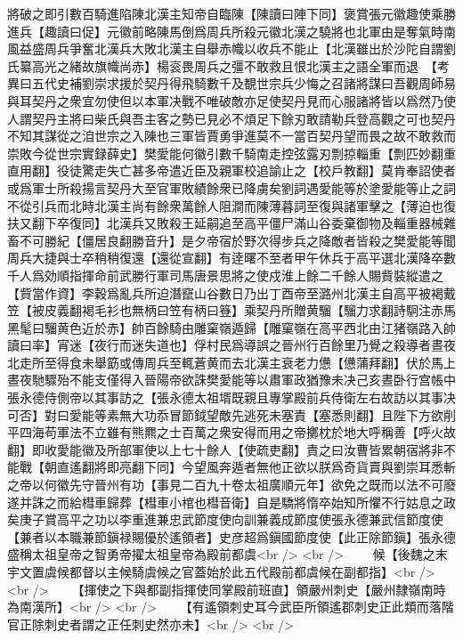 將破之即引數百騎進陷陳北漢主知帝自臨陳【陳讀曰陣下同】褒賞張元徽趣使乘勝進兵【趣讀曰促】元徽前略陳馬倒爲周兵所殺元徽北漢之驍將也北軍由是奪氣時南風益盛周兵爭奮北漢兵大敗北漢主自舉赤幟以收兵不能止【北漢雖出於沙陀自謂劉氏纂高光之緒故旗幟尚赤】楊衮畏周兵之彊不敢救且恨北漢主之語全軍而退　【考異曰五代史補劉崇求援於契丹得飛騎數千及覩世宗兵少悔之召諸將謀曰吾觀周師易與耳契丹之衆宜勿使但以本軍决戰不唯破敵亦足使契丹見而心服諸將皆以爲然乃使人謂契丹主將曰柴氏與吾主客之勢已見必不煩足下餘刃敢請勒兵登高觀之可也契丹不知其謀從之洎世宗之入陳也三軍皆賈勇爭進莫不一當百契丹望而畏之故不敢救而崇敗今從世宗實録薛史】樊愛能何徽引數千騎南走控弦露刃剽掠輜重【剽匹妙翻重直用翻】役徒驚走失亡甚多帝遣近臣及親軍校追諭止之【校戶教翻】莫肯奉詔使者或爲軍士所殺揚言契丹大至官軍敗績餘衆已降虜矣劉詞遇愛能等於塗愛能等止之詞不從引兵而北時北漢主尚有餘衆萬餘人阻澗而陳薄暮詞至復與諸軍擊之【薄迫也復扶又翻下卒復同】北漢兵又敗殺王延嗣追至高平僵尸滿山谷委棄御物及輜重器械雜畜不可勝紀【僵居良翻勝音升】是夕帝宿於野次得步兵之降敵者皆殺之樊愛能等聞周兵大捷與士卒稍稍復還【還從宣翻】有逹曙不至者甲午休兵于高平選北漢降卒數千人爲効順指揮命前武勝行軍司馬唐景思將之使戍淮上餘二千餘人賜貲裝縱遣之【貲當作資】李穀爲亂兵所迫潛竄山谷數日乃出丁酉帝至潞州北漢主自高平被褐戴笠【被皮義翻褐毛衫也無柄曰笠有柄曰簦】乘契丹所贈黄騮【騮力求翻詩駉注赤馬黑髦曰騮黄色近於赤】帥百餘騎由雕窠嶺遁歸【雕窠嶺在高平西北由江猪嶺路入帥讀曰率】宵迷【夜行而迷失道也】俘村民爲導誤之晉州行百餘里乃覺之殺導者晝夜北走所至得食未舉筯或傳周兵至輒蒼黄而去北漢主衰老力憊【憊蒲拜翻】伏於馬上晝夜馳驟殆不能支僅得入晉陽帝欲誅樊愛能等以肅軍政猶豫未决己亥晝卧行宫帳中張永德侍側帝以其事訪之【張永德太祖壻既親且專掌殿前兵侍衛左右故訪以其事决可否】對曰愛能等素無大功忝冒節鉞望敵先逃死未塞責【塞悉則翻】且陛下方欲削平四海苟軍法不立雖有熊羆之士百萬之衆安得而用之帝擲枕於地大呼稱善【呼火故翻】即收愛能徽及所部軍使以上七十餘人【使疏吏翻】責之曰汝曹皆累朝宿將非不能戰【朝直遙翻將即亮翻下同】今望風奔遁者無他正欲以朕爲奇貨賣與劉崇耳悉斬之帝以何徽先守晉州有功【事見二百九十卷太祖廣順元年】欲免之既而以法不可廢遂并誅之而給槥車歸葬【槥車小棺也槥音衛】自是驕將惰卒始知所懼不行姑息之政矣庚子賞高平之功以李重進兼忠武節度使向訓兼義成節度使張永德兼武信節度使【兼者以本職兼節鎭禄賜優於遙領者】史彦超爲鎭國節度使【此正除節鎭】張永德盛稱太祖皇帝之智勇帝擢太祖皇帝為殿前都虞<br />
<br />
　　候【後魏之末宇文置虞候都督以主候騎虞候之官蓋始於此五代殿前都虞候在副都指】<br />
<br />
　　【揮使之下與都副指揮使同掌殿前班直】領嚴州刺史【嚴州隸嶺南時為南漢所】<br />
<br />
　　【有遙領刺史耳今武臣所領遙郡刺史正此類而落階官正除刺史者謂之正任刺史然亦未】<br />
<br />
